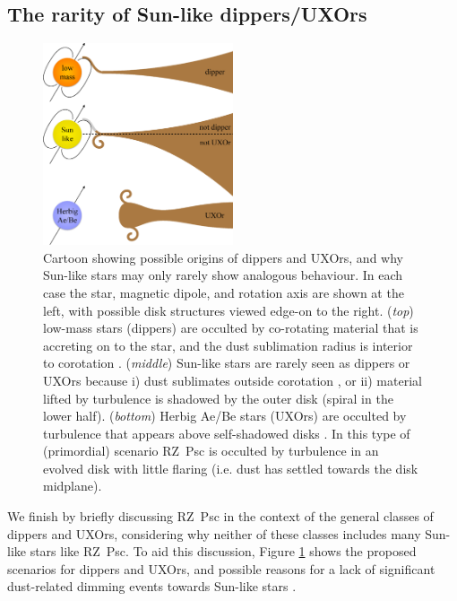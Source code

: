 \documentclass[useAMS,usenatbib,usegraphicx]{mn2e}
\begin{document}
\subsection{The rarity of Sun-like dippers/UXOrs}\label{ss:rarity}

\begin{figure}
  \begin{center}
    \hspace{-0.5cm} \includegraphics[width=0.5\textwidth]{figs/cartoon-crop.ps}
    \caption{Cartoon showing possible origins of dippers and UXOrs, and why Sun-like
      stars may only rarely show analogous behaviour. In each case the star, magnetic
      dipole, and rotation axis are shown at the left, with possible disk structures
      viewed edge-on to the right. (\emph{top}) low-mass stars (dippers) are occulted by
      co-rotating material that is accreting on to the star, and the dust sublimation
      radius is interior to corotation \citep{2016arXiv160503985B}. (\emph{middle})
      Sun-like stars are rarely seen as dippers or UXOrs because i) dust sublimates
      outside corotation \citep[][represented by the grey accretion column in the upper
      half]{2016arXiv160503985B}, or ii) material lifted by turbulence is shadowed by the
      outer disk (spiral in the lower half). (\emph{bottom}) Herbig Ae/Be stars (UXOrs)
      are occulted by turbulence that appears above self-shadowed disks
      \citep{2003ApJ...594L..47D}. In this type of (primordial) scenario RZ~Psc is
      occulted by turbulence in an evolved disk with little flaring (i.e. dust has
      settled towards the disk midplane).}\label{fig:cartoon}
  \end{center}
\end{figure}

We finish by briefly discussing RZ~Psc in the context of the general classes of dippers
and UXOrs, considering why neither of these classes includes many Sun-like stars like
RZ~Psc. To aid this discussion, Figure \ref{fig:cartoon} shows the proposed scenarios for
dippers and UXOrs, and possible reasons for a lack of significant dust-related dimming
events towards Sun-like stars \citep[see][for similar figures for
dippers]{2016arXiv160503985B}.
\end{document}
